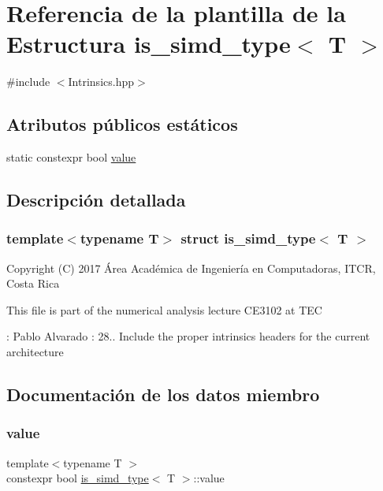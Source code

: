 \hypertarget{structis__simd__type}{}\section{Referencia de la plantilla de la Estructura is\+\_\+simd\+\_\+type$<$ T $>$}
\label{structis__simd__type}


{\ttfamily \#include $<$Intrinsics.\+hpp$>$}

\subsection*{Atributos públicos estáticos}
\begin{DoxyCompactItemize}
\item 
static constexpr bool \hyperlink{structis__simd__type_aa7be8981b3d01e0ca0f163c4d7266a44}{value}
\end{DoxyCompactItemize}


\subsection{Descripción detallada}
\subsubsection*{template$<$typename T$>$\newline
struct is\+\_\+simd\+\_\+type$<$ T $>$}

Copyright (C) 2017 Área Académica de Ingeniería en Computadoras, I\+T\+CR, Costa Rica

This file is part of the numerical analysis lecture C\+E3102 at T\+EC

\+: Pablo Alvarado \+: 28.. Include the proper intrinsics headers for the current architecture 

\subsection{Documentación de los datos miembro}
\mbox{\label{structis__simd__type_aa7be8981b3d01e0ca0f163c4d7266a44}} 
\subsubsection{\texorpdfstring{value}{value}}
{\footnotesize\ttfamily template$<$typename T $>$ \\
constexpr bool \hyperlink{structis__simd__type}{is\+\_\+simd\+\_\+type}$<$ T $>$\+::value\hspace{0.3cm}{\ttfamily [static]}}

